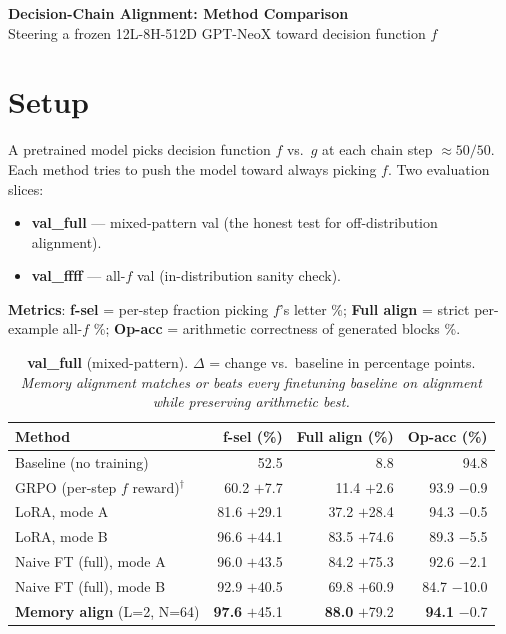 \documentclass[10pt]{article}
\newcommand{\posv}[1]{\textcolor{good}{\,{\scriptsize$+$#1}}}
\newcommand{\negv}[1]{\textcolor{bad}{\,{\scriptsize$-$#1}}}
\begin{document}
\begin{center}
  {\Large\bfseries Decision-Chain Alignment: Method Comparison}\\[3pt]
  {\small Steering a frozen 12L-8H-512D GPT-NeoX toward decision function $f$}
\end{center}

\section*{Setup}

A pretrained model picks decision function $f$ vs.\ $g$ at each chain step
$\approx 50/50$. Each method tries to push the model toward always picking
$f$. Two evaluation slices:

\begin{itemize}[leftmargin=1.5em, itemsep=1pt]
  \item \textbf{val\_full} --- mixed-pattern val (the honest test for
    off-distribution alignment).
  \item \textbf{val\_ffff} --- all-$f$ val (in-distribution sanity check).
\end{itemize}

\textbf{Metrics}:
\textbf{f-sel} = per-step fraction picking $f$'s letter \%;
\textbf{Full align} = strict per-example all-$f$ \%;
\textbf{Op-acc} = arithmetic correctness of generated blocks \%.

\vspace{6pt}

\begin{table}[ht]
  \centering\small
  \caption{\textbf{val\_full} (mixed-pattern). $\Delta$ = change vs.\ baseline
    in percentage points. \emph{Memory alignment matches or beats every
    finetuning baseline on alignment while preserving arithmetic best.}}
  \label{tab:full}
  \begin{tabular}{lrrr}
    \toprule
    \textbf{Method}
      & \textbf{f-sel} (\%)
      & \textbf{Full align} (\%)
      & \textbf{Op-acc} (\%) \\
    \midrule
    Baseline (no training)            & 52.5             & 8.8              & 94.8             \\
    \midrule
    GRPO (per-step $f$ reward)$^{\dagger}$   & 60.2\,\posv{7.7}   & 11.4\,\posv{2.6}   & 93.9\,\negv{0.9}   \\
    LoRA, mode A                      & 81.6\,\posv{29.1}  & 37.2\,\posv{28.4}  & 94.3\,\negv{0.5}   \\
    LoRA, mode B                      & 96.6\,\posv{44.1}  & 83.5\,\posv{74.6}  & 89.3\,\negv{5.5}   \\
    Naive FT (full), mode A           & 96.0\,\posv{43.5}  & 84.2\,\posv{75.3}  & 92.6\,\negv{2.1}   \\
    Naive FT (full), mode B           & 92.9\,\posv{40.5}  & 69.8\,\posv{60.9}  & 84.7\,\negv{10.0}  \\
    \rowcolor{rowhl}
    \textbf{Memory align} (L=2, N=64) & \textbf{97.6}\,\posv{45.1} & \textbf{88.0}\,\posv{79.2} & \textbf{94.1}\,\negv{0.7} \\
    \bottomrule
  \end{tabular}
\end{table}
\end{document}

